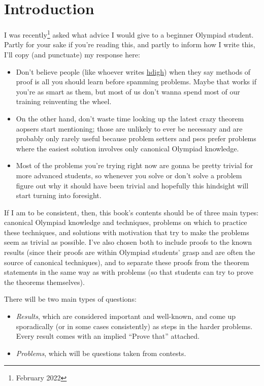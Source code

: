 \chapter*{Introduction}
I was recently\footnote{February 2022} asked what advice I would give to a
beginner Olympiad student. Partly for your sake if you're reading this, and
partly to inform how I write this, I'll copy (and punctuate) my response here:
\begin{itemize}
  \item Don't believe people (like whoever writes
    \href{https://web.archive.org/web/20220102030159/https://how-did-i-get-here.com/olympiad/}{hdigh}) when they say methods
    of proof is all you should learn before spamming problems. Maybe that works
    if you're as smart as them, but most of us don't wanna spend most of our
    training reinventing the wheel.
  \item On the other hand, don't waste time looking up the latest crazy theorem
    aopsers start mentioning; those are unlikely to ever be necessary and are
    probably only rarely useful because problem setters and pscs prefer problems
    where the easiest solution involves only canonical Olympiad knowledge.
  \item Most of the problems you're trying right now are gonna be pretty
    trivial for more advanced students, so whenever you solve or
    don't solve a problem figure out why it should have been trivial and
    hopefully this hindsight will start turning into foresight.
\end{itemize}

If I am to be consistent, then, this book's contents should be of three main
types: canonical Olympiad knowledge and techniques, problems on which to
practice these techniques, and solutions with motivation that try to make the
problems seem as trivial as possible. I've also chosen both to include proofs to
the known results (since their proofs are within Olympiad students' grasp and
are often the source of canonical techniques), and to separate these proofs from
the theorem statements in the same way as with problems (so that
students can try to prove the theorems themselves). 

There will be two main types of questions:
\begin{itemize}
  \item \emph{Results}, which are considered important and well-known, and come
    up sporadically (or in some cases consistently) as steps in the harder
    problems. Every result comes with an implied ``Prove that'' attached.
  \item \emph{Problems}, which will be questions taken from contests.
\end{itemize}

